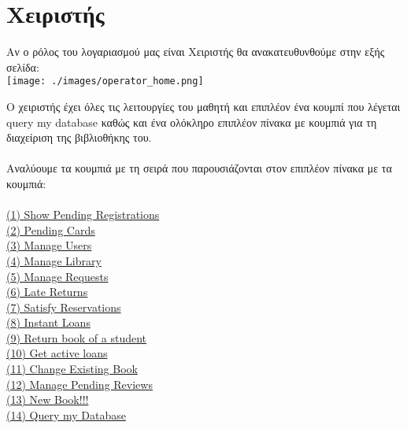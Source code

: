 \documentclass[14pt]{report}
\begin{document}
	\newpage
	\hypertarget{operator-anchor-buttons}{}
	\chapter*{\Large Χειριστής}
	Αν ο ρόλος του λογαριασμού  μας είναι Χειριστής θα ανακατευθυνθούμε στην εξής σελίδα: \\
	\texttt{[image: ./images/operator\_home.png]}
	
	\vspace{\baselineskip}
	
	Ο χειριστής έχει όλες τις λειτουργίες του μαθητή και επιπλέον ένα κουμπί που λέγεται query my database καθώς και ένα ολόκληρο επιπλέον πίνακα με κουμπιά για τη διαχείριση της βιβλιοθήκης του. \\ \\
	
	\newpage
	Αναλύουμε τα κουμπιά με τη σειρά που παρουσιάζονται στον επιπλέον πίνακα με τα κουμπιά: \\ \\
	\hyperlink{o-show-pending-reg}{(1) Show Pending Registrations} \\
	\hyperlink{o-pending-cards}{(2) Pending Cards} \\
	\hyperlink{o-manage-users}{(3) Manage Users} \\
	\hyperlink{o-manage-library}{(4) Manage Library} \\
	\hyperlink{o-manage-request}{(5) Manage Requests} \\
	\hyperlink{o-late-returns}{(6) Late Returns} \\
	\hyperlink{o-satisfy-res}{(7) Satisfy Reservations} \\
	\hyperlink{o-instant-loans}{(8) Instant Loans} \\
	\hyperlink{o-return-book}{(9) Return book of a student} \\
	\hyperlink{o-get-active-loans}{(10) Get active loans} \\
	\hyperlink{o-change-book}{(11) Change Existing Book} \\
	\hyperlink{o-manage-pending-reviews}{(12) Manage Pending Reviews} \\
	\hyperlink{o-new-book}{(13) New Book!!!} \\
	\hyperlink{o-query-database}{(14) Query my Database} \\
	
\end{document}
